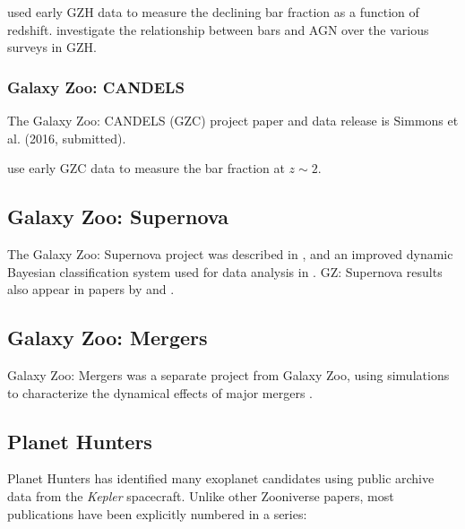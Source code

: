 \documentclass[twocolumn]{aastex6}
\begin{document}
\citet{mel14} used early GZH data to measure the declining bar fraction as a function of redshift. \citet{che15} investigate the relationship between bars and AGN over the various surveys in GZH.

\subsubsection{Galaxy Zoo: CANDELS}

The Galaxy Zoo: CANDELS (GZC) project paper and data release is Simmons et al. (2016, submitted).

\citet{sim14} use early GZC data to measure the bar fraction at $z\sim2$.

\subsection{Galaxy Zoo: Supernova}

The Galaxy Zoo: Supernova project was described in \citet{smi11}, and an improved dynamic Bayesian classification system used for data analysis in \citet{sim13a}. GZ: Supernova results also appear in papers by \citet{mag11,mag12a} and \citet{lev13}. 

\subsection{Galaxy Zoo: Mergers}

Galaxy Zoo: Mergers was a separate project from Galaxy Zoo, using simulations to characterize the dynamical effects of major mergers \citep{hol16}.

\subsection{Planet Hunters}

Planet Hunters has identified many exoplanet candidates using public archive data from the {\it Kepler} spacecraft. Unlike other Zooniverse papers, most publications have been explicitly numbered in a series:
\end{document}
